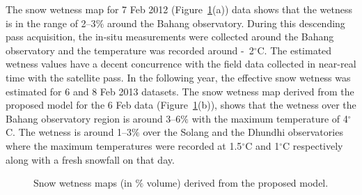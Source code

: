 The snow wetness map for 7 Feb 2012 (Figure~\ref{fig:proposed_results_fullpol1}(a)) data shows that the wetness is in the range of 2--3$\%$ around the Bahang observatory. During this descending pass acquisition, the in-situ measurements were collected around the Bahang observatory and the temperature was recorded around -~2$^\circ$C. The estimated wetness values have a decent concurrence with the field data collected in near-real time with the satellite pass. In the following year, the effective snow wetness was estimated for 6 and 8 Feb 2013 datasets. The snow wetness map derived from the proposed model for the 6 Feb data (Figure~\ref{fig:proposed_results_fullpol1}(b)), shows that the wetness over the Bahang observatory region is around 3--6$\%$ with the maximum temperature of 4$^\circ$C. The wetness is around 1--3$\%$ over the Solang and the Dhundhi observatories where the maximum temperatures were recorded at 1.5$^\circ$C and 1$^\circ$C respectively along with a fresh snowfall on that day. 
\begin{figure}[!thpb]
	\centering
	\caption [Snow wetness maps of 07 Feb. 2012 and 06 Feb. 2013 Radarsat-2 data]{Snow wetness maps (in $\%$ volume) derived from the proposed model.} 
	\label{fig:proposed_results_fullpol1}
\end{figure}

